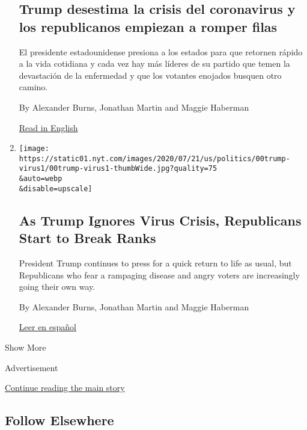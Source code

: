 \begin{enumerate}
{  \subsection{Trump desestima la crisis del coronavirus y los
  republicanos empiezan a romper
  filas}\label{trump-desestima-la-crisis-del-coronavirus-y-los-republicanos-empiezan-a-romper-filas}}

  El presidente estadounidense presiona a los estados para que retornen
  rápido a la vida cotidiana y cada vez hay más líderes de su partido
  que temen la devastación de la enfermedad y que los votantes enojados
  busquen otro camino.

  By Alexander Burns, Jonathan Martin and Maggie Haberman

  \href{https://www.nytimes.com/2020/07/19/us/politics/republicans-contradict-trump-coronavirus.html}{Read
  in English}
\item
  \href{/2020/07/19/us/politics/republicans-contradict-trump-coronavirus.html}{}

  \texttt{[image: https://static01.nyt.com/images/2020/07/21/us/politics/00trump-virus1/00trump-virus1-thumbWide.jpg?quality=75\\\&auto=webp\\\&disable=upscale]}

  \hypertarget{as-trump-ignores-virus-crisis-republicans-start-to-break-ranks}{%
  \subsection{As Trump Ignores Virus Crisis, Republicans Start to Break
  Ranks}\label{as-trump-ignores-virus-crisis-republicans-start-to-break-ranks}}

  President Trump continues to press for a quick return to life as
  usual, but Republicans who fear a rampaging disease and angry voters
  are increasingly going their own way.

  By Alexander Burns, Jonathan Martin and Maggie Haberman

  \href{https://www.nytimes.com/es/2020/07/21/espanol/estados-unidos/donald-trump-coronavirus-republicanos.html}{Leer
  en español}
\end{enumerate}

Show More

Advertisement

\protect\hyperlink{after-mid2}{Continue reading the main story}

\hypertarget{follow-elsewhere}{%
\subsection{Follow Elsewhere}\label{follow-elsewhere}}


